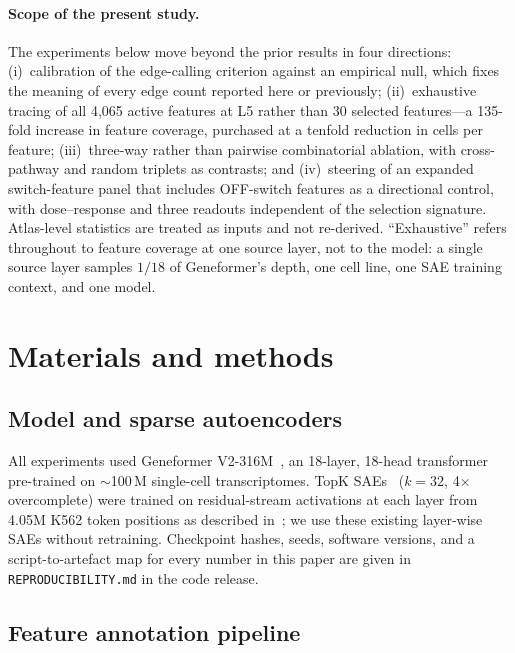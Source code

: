 \documentclass[11pt,onecolumn]{article}
\begin{document}
\paragraph{Scope of the present study.}
The experiments below move beyond the prior results in four directions: (i)~calibration of the edge-calling criterion against an empirical null, which fixes the meaning of every edge count reported here or previously; (ii)~exhaustive tracing of all 4{,}065 active features at L5 rather than 30 selected features---a 135-fold increase in feature coverage, purchased at a tenfold reduction in cells per feature; (iii)~three-way rather than pairwise combinatorial ablation, with cross-pathway and random triplets as contrasts; and (iv)~steering of an expanded switch-feature panel that includes OFF-switch features as a directional control, with dose--response and three readouts independent of the selection signature. Atlas-level statistics are treated as inputs and not re-derived. ``Exhaustive'' refers throughout to feature coverage at one source layer, not to the model: a single source layer samples $1/18$ of Geneformer's depth, one cell line, one SAE training context, and one model.


\section{Materials and methods}
\label{sec:methods}

\subsection{Model and sparse autoencoders}

All experiments used Geneformer V2-316M~\citep{theodoris2023transfer}, an 18-layer, 18-head transformer pre-trained on $\sim$100\,M single-cell transcriptomes. TopK SAEs~\citep{makhzani2013ksparse} ($k=32$, 4$\times$ overcomplete) were trained on residual-stream activations at each layer from 4.05M K562 token positions as described in~\citep{kendiukhov2025sae_atlas}; we use these existing layer-wise SAEs without retraining. Checkpoint hashes, seeds, software versions, and a script-to-artefact map for every number in this paper are given in \texttt{REPRODUCIBILITY.md} in the code release.

\subsection{Feature annotation pipeline}
\label{sec:annotation}
\end{document}
